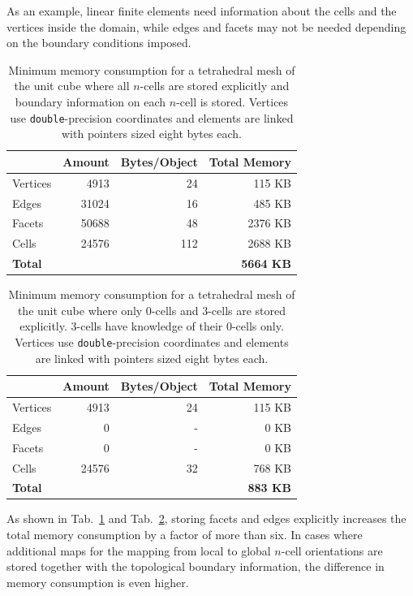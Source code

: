As an example, linear finite elements need information about the cells and the vertices inside the domain, while edges and facets may not be needed depending on the boundary conditions imposed.

\begin{table}[tb]
 \centering
 \begin{tabular}{|l|r|r|r|}
  \hline
         & Amount      & Bytes/Object         & Total Memory \\
  \hline
  Vertices & 4913 & 24 & 115 KB \\
  \hline
  Edges   & 31024 & 16 & 485 KB \\
  \hline
  Facets  & 50688 & 48 & 2376 KB \\
  \hline
  Cells   & 24576 & 112 & 2688 KB \\
  \hline
  \textbf{Total}  &       &     &  \textbf{5664 KB} \\
  \hline
 \end{tabular}
 \caption{Minimum memory consumption for a tetrahedral mesh of the unit cube where all $n$-cells are stored explicitly and boundary information on each $n$-cell is stored. Vertices use \lstinline|double|-precision coordinates and elements are linked with pointers sized eight bytes each.}
 \label{tab:full-domain-memory}
\end{table}

\begin{table}[tb]
 \centering
 \begin{tabular}{|l|r|r|r|}
  \hline
         & Amount      & Bytes/Object         & Total Memory \\
  \hline
  Vertices & 4913 & 24 & 115 KB \\
  \hline
  Edges   & 0 & - & 0 KB \\
  \hline
  Facets  & 0 & - & 0 KB \\
  \hline
  Cells   & 24576 & 32 & 768 KB \\
  \hline
  \textbf{Total}  &       &     &  \textbf{883 KB} \\
  \hline
 \end{tabular}
 \caption{Minimum memory consumption for a tetrahedral mesh of the unit cube where only $0$-cells and $3$-cells are stored explicitly. $3$-cells have knowledge of their $0$-cells only. Vertices use \lstinline|double|-precision coordinates and elements are linked with pointers sized eight bytes each.}
 \label{tab:slim-domain-memory}
\end{table}

As shown in Tab.~\ref{tab:full-domain-memory} and Tab.~\ref{tab:slim-domain-memory}, storing facets and edges explicitly increases the total memory consumption by a factor of more than six. In cases where additional maps for the mapping from local to global $n$-cell orientations are stored together with the topological boundary information, the difference in memory consumption is even higher.

